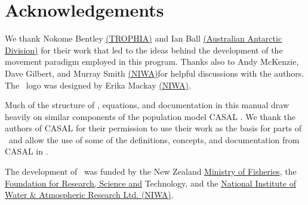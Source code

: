 \section{Acknowledgements\label{sec:acknowledgements}}

We thank Nokome Bentley \href{http://www.trophia.co.nz}{(TROPHIA)} and Ian Ball \href{http://www.aad.gov.au}{(Australian Antarctic Division)} for their work that led to the ideas behind the development of the movement paradigm employed in this program. Thanks also to Andy McKenzie, Dave Gilbert, and Murray Smith \href{http://www.niwa.co.nz}{(NIWA)}for  helpful discussions with the authors. The \SPM\ logo was designed by Erika Mackay \href{http://www.niwa.co.nz}{(NIWA)}. 

Much of the structure of \SPM, equations, and documentation in this manual draw heavily on similar components of the population model CASAL \citep{1388}. We thank the authors of CASAL for their permission to use their work as the basis for parts of \SPM\ and allow the use of some of the definitions, concepts, and documentation from CASAL in \SPM. 

The development of \SPM\ was funded by the New Zealand \href{http://www.fish.govt.nz}{Ministry of Fisheries}, the \href{http://www.frst.govt.nz}{Foundation for Research, Science and} Technology, and the \href{http://www.niwa.co.nz}{National Institute of Water \& Atmospheric Research Ltd. (NIWA)}. 
